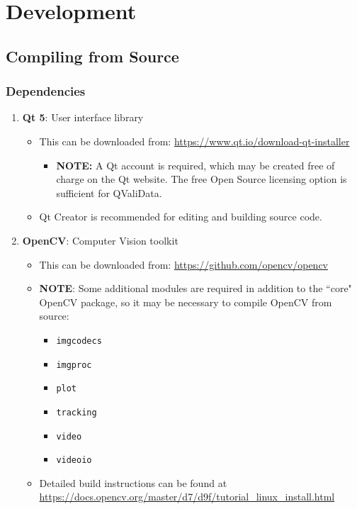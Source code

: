 \documentclass[]{article}
\begin{document}
\section{Development}
	\subsection{Compiling from Source}
		\subsubsection{Dependencies}
		\begin{enumerate}
			\item \textbf{Qt 5}: User interface library
				\begin{itemize}
					\item This can be downloaded from: \href{https://www.qt.io/download-qt-installer}{https://www.qt.io/download-qt-installer}
						\begin{itemize}
							\item \textbf{NOTE:} A Qt account is required, which may be created free of charge on the Qt website. The free Open Source licensing option is sufficient for QValiData.
						\end{itemize}
					\item Qt Creator is recommended for editing and building source code.
				\end{itemize}
			\item \textbf{OpenCV}: Computer Vision toolkit
				\begin{itemize}
					\item This can be downloaded from: \href{https://github.com/opencv/opencv}{https://github.com/opencv/opencv}
					\item \textbf{NOTE}: Some additional modules are required in addition to the ``core" OpenCV package, so it may be necessary to compile OpenCV from source:
						\begin{itemize}
							\item \texttt{imgcodecs}
							\item \texttt{imgproc}
							\item \texttt{plot}
							\item \texttt{tracking}
							\item \texttt{video}
							\item \texttt{videoio}
						\end{itemize}
					\item Detailed build instructions can be found at\\ \href{https://docs.opencv.org/master/d7/d9f/tutorial_linux_install.html}{https://docs.opencv.org/master/d7/d9f/tutorial\_linux\_install.html}\\

\end{itemize}
\end{enumerate}
\end{document}
